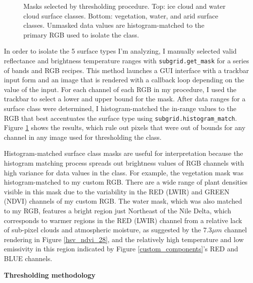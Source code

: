 \documentclass[12pt]{article}
\begin{document}
\begin{figure}[h!]
    \caption{Masks selected by thresholding procedure. Top: ice cloud and water cloud surface classes. Bottom: vegetation, water, and arid surface classes. Unmasked data values are histogram-matched to the primary RGB used to isolate the class.}
    \label{thresh_masks}
\end{figure}

In order to isolate the 5 surface types I'm analyzing, I manually selected valid reflectance and brightness temperature ranges with \texttt{subgrid.get\_mask} for a series of bands and RGB recipes. This method launches a GUI interface with a trackbar input form and an image that is rendered with a callback loop depending on the value of the input. For each channel of each RGB in my procedure, I used the trackbar to select a lower and upper bound for the mask. After data ranges for a surface class were determined, I histogram-matched the in-range values to the RGB that best accentuates the surface type using \texttt{subgrid.histogram\_match}. Figure \ref{thresh_masks} shows the results, which rule out pixels that were out of bounds for any channel in any image used for thresholding the class.

Histogram-matched surface class masks are useful for interpretation because the histogram matching process spreads out brightness values of RGB channels with high variance for data values in the class. For example, the vegetation mask was histogram-matched to my custom RGB. There are a wide range of plant densities visible in this mask due to the variability in the RED (LWIR) and GREEN (NDVI) channels of my custom RGB. The water mask, which was also matched to my RGB, features a bright region just Northeast of the Nile Delta, which corresponds to warmer regions in the RED (LWIR) channel from a relative lack of sub-pixel clouds and atmospheric moisture, as suggested by the $7.3\mu m$ channel rendering in Figure \ref{hsv_ndvi_28}, and the relatively high temperature and low emissivity in this region indicated by Figure \ref{custom_components}'s RED and BLUE channels.

\clearpage

\noindent
\textbf{Thresholding methodology}
\end{document}
